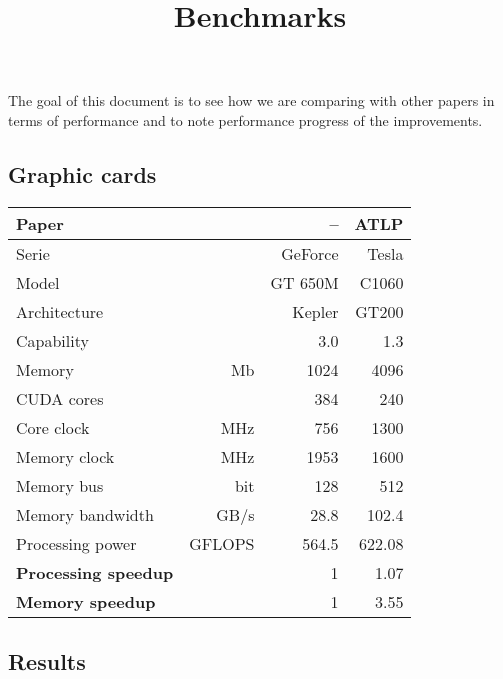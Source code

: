 

\title{Benchmarks}

\maketitle
\pagestyle{headings}

The goal of this document is to see how we are comparing with other papers in terms of performance and to note performance progress of the improvements.

\subsection*{Graphic cards}
\def\unt#1{& \footnotesize #1}
\begin{center}\begin{tabular}{lrrr} \toprule
\bf Paper		&				& \bf -- 		& \bf  ATLP\cite{gpu_atlp} \\ \midrule
Serie		&				& GeForce	& Tesla \\
Model		&				& GT 650M	& C1060 \\
Architecture	&				& Kepler		& GT200 \\
Capability		&				& 3.0		& 1.3 \\
Memory \unt{Mb}				& 1024		& 4096 \\
CUDA cores &					& 384		& 240 \\
Core clock \unt{MHz}			& 756		& 1300 \\
Memory clock \unt{MHz}			& 1953		& 1600 \\
Memory bus \unt{bit}				& 128		& 512 \\
Memory bandwidth \unt{GB/s}		& 28.8		& 102.4 \\
Processing power \unt{GFLOPS}	&564.5		& 622.08 \\ \midrule
\bf Processing speedup & 		& 1			& 1.07 \\
\bf Memory speedup & 			& 1			& 3.55 \\ \bottomrule
\end{tabular}\end{center}

\subsection*{Results}
